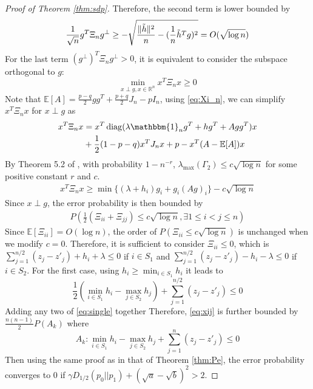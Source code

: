 \documentclass[conference]{IEEEtran}
\DeclarePairedDelimiter\norm{\lVert}{\rVert}
\DeclareMathOperator{\diag}{diag}
\begin{document}
\begin{proof}[Proof of Theorem \ref{thm:sdp}]
Therefore, the second term is lower bounded by
		$$
			\frac{1}{\sqrt{n}} g^T \Xi_n g^{\perp} \geq -\sqrt{\frac{\norm{\tilde{h}}^2}{n} - (\frac{1}{n}\tilde{h}^Tg)^2} = O(\sqrt{\log n})
		$$
		For the last term $(g^{\perp})^T \Xi_n g^{\perp} >0$, it is equivalent
		to consider the subspace orthogonal to $g$:
		$$
		\min_{x \perp g, x \in \mathbb{R}^n } x^T \Xi_n x \geq 0
		$$
		Note that $\mathbb{E}[A] = \frac{p-q}{2}gg^T + \frac{p+q}{2}J_n - pI_n$,
		using \eqref{eq:Xi_n}, we can simplify $x^T \Xi_n x$ for $x \perp g$ as
		\begin{align*}
		x^T \Xi_n x &= x^T \diag( \lambda \mathbbm{1}_ng^T+hg^T + Agg^T) x  \\
		&+ \frac{1}{2}(1-p-q)x^TJ_n x
		 + p -x^T(A-\mathbb{E}[A])x
		\end{align*}
		By Theorem 5.2 of \cite{lei2015consistency},
		with probability $1-n^{-r}$, $\lambda_{\max}(\Gamma_2) \leq c\sqrt{\log n}$ for some positive constant $r$ and $c$.
		\begin{align*}
		x^T \Xi_n x \geq \min\{(\lambda + h_i) g_i + g_i (Ag)_i \} - c \sqrt{\log n}
		\end{align*}
		Since $x\perp g$, the error probability is then bounded by
		\begin{align}\label{eq:xij}
		P(\frac{1}{2}(\Xi_{ii} + \Xi_{jj}) \leq c\sqrt{\log n}, \exists 1\leq i < j \leq n)
		\end{align}
		Since $\mathbb{E}[\Xi_{ii}]=O(\log n)$, the order of $P(\Xi_{ii} \leq c\sqrt{\log n})$ is unchanged when we modify $c=0$. Therefore, it is sufficient to consider $\Xi_{ii} \leq 0 $, which is
		$\sum_{j=1}^{n/2} (z_j - z'_j) + h_i + \lambda \leq 0$ if $i \in S_1$ and
		$\sum_{j=1}^{n/2} (z_j - z'_j) - h_i - \lambda \leq 0$ if $i \in S_2$.
		For the first case, using $h_i \geq \min_{i \in S_1} h_i$ it leads
		to
		\begin{equation}\label{eq:single}
		\frac{1}{2}(\min_{i \in S_1} h_i  - \max_{ j \in S_2} h_j) + \sum_{j=1}^{n/2} (z_j - z'_j) \leq 0
		\end{equation}
		Adding any two of \eqref{eq:single} together
		Therefore, \eqref{eq:xij} is further bounded by $\frac{n(n-1)}{2}P(A_k)$
		where
		$$
		A_k: \min_{i \in S_1} h_i  - \max_{ j \in S_2} h_j + \sum_{j=1}^{n} (z_j - z'_j) \leq 0
		$$
		Then using the same proof as in that of Theorem \eqref{thm:Pe}, the error probability converges to 0
		if $\gamma D_{1/2}(p_0||p_1) + (\sqrt{a} - \sqrt{b})^2 > 2$.
		
	\end{proof}
	
	
	
\end{document}
